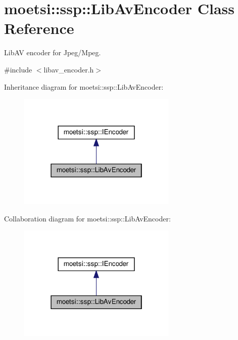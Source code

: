 \hypertarget{classmoetsi_1_1ssp_1_1LibAvEncoder}{}\section{moetsi\+:\+:ssp\+:\+:Lib\+Av\+Encoder Class Reference}
\label{classmoetsi_1_1ssp_1_1LibAvEncoder}


Lib\+AV encoder for Jpeg/\+Mpeg.  




{\ttfamily \#include $<$libav\+\_\+encoder.\+h$>$}



Inheritance diagram for moetsi\+:\+:ssp\+:\+:Lib\+Av\+Encoder\+:\nopagebreak
\begin{figure}[H]
\begin{center}
\leavevmode
\includegraphics[width=214pt]{classmoetsi_1_1ssp_1_1LibAvEncoder__inherit__graph}
\end{center}
\end{figure}


Collaboration diagram for moetsi\+:\+:ssp\+:\+:Lib\+Av\+Encoder\+:\nopagebreak
\begin{figure}[H]
\begin{center}
\leavevmode
\includegraphics[width=214pt]{classmoetsi_1_1ssp_1_1LibAvEncoder__coll__graph}
\end{center}
\end{figure}
